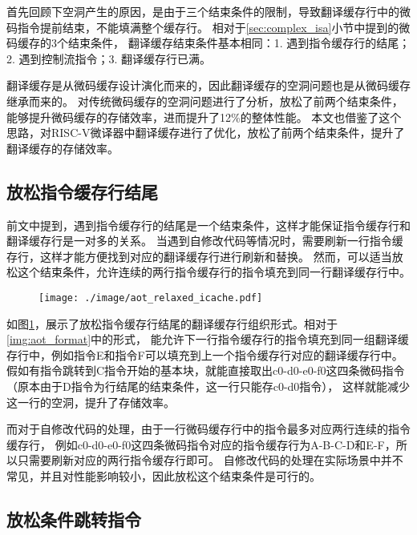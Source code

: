 首先回顾下空洞产生的原因，是由于三个结束条件的限制，导致翻译缓存行中的微码指令提前结束，不能填满整个缓存行。
相对于\ref{sec:complex_isa}小节中提到的微码缓存的3个结束条件，
翻译缓存结束条件基本相同：1. 遇到指令缓存行的结尾；2. 遇到控制流指令；3. 翻译缓存行已满。


翻译缓存是从微码缓存设计演化而来的，因此翻译缓存的空洞问题也是从微码缓存继承而来的。
\cite{kotraImprovingUtilizationMicrooperation2020}
对传统微码缓存的空洞问题进行了分析，放松了前两个结束条件，能够提升微码缓存的存储效率，进而提升了12\%的整体性能。
本文也借鉴了这个思路，对RISC-V微译器中翻译缓存进行了优化，放松了前两个结束条件，提升了翻译缓存的存储效率。

\subsection{放松指令缓存行结尾}

前文中提到，遇到指令缓存行的结尾是一个结束条件，这样才能保证指令缓存行和翻译缓存行是一对多的关系。
当遇到自修改代码等情况时，需要刷新一行指令缓存行，这样才能方便找到对应的翻译缓存行进行刷新和替换。
然而，可以适当放松这个结束条件，允许连续的两行指令缓存行的指令填充到同一行翻译缓存行中。

\begin{figure}[!htbp]
    \centering
    \texttt{[image: ./image/aot\_relaxed\_icache.pdf]}
    \label{img:aot_relaxed_icache}
  \end{figure}

如图\ref{img:aot_relaxed_icache}，展示了放松指令缓存行结尾的翻译缓存行组织形式。相对于\ref{img:aot_format}中的形式，
能允许下一行指令缓存行的指令填充到同一组翻译缓存行中，例如指令E和指令F可以填充到上一个指令缓存行对应的翻译缓存行中。
假如有指令跳转到C指令开始的基本块，就能直接取出c0-d0-e0-f0这四条微码指令（原本由于D指令为行结尾的结束条件，这一行只能存c0-d0指令），
这样就能减少这一行的空洞，提升了存储效率。

而对于自修改代码的处理，由于一行微码缓存行中的指令最多对应两行连续的指令缓存行，
例如c0-d0-e0-f0这四条微码指令对应的指令缓存行为A-B-C-D和E-F，所以只需要刷新对应的两行指令缓存行即可。
自修改代码的处理在实际场景中并不常见，并且对性能影响较小，因此放松这个结束条件是可行的。

\subsection{放松条件跳转指令}


